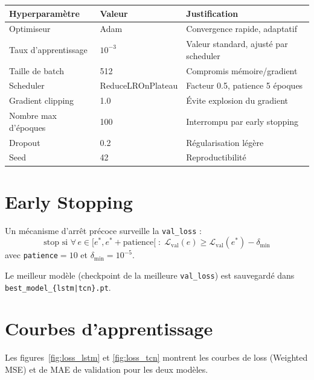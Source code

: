 \documentclass[12pt,a4paper]{report}
\begin{document}
\begin{center}
\begin{tabular}{lll}
\toprule
\rowcolor{fireOrange!15}
\textbf{Hyperparamètre} & \textbf{Valeur} & \textbf{Justification} \\
\midrule
Optimiseur             & Adam             & Convergence rapide, adaptatif \\
Taux d'apprentissage   & $10^{-3}$        & Valeur standard, ajusté par scheduler \\
Taille de batch        & 512              & Compromis mémoire/gradient \\
Scheduler              & ReduceLROnPlateau & Facteur 0.5, patience 5 époques \\
Gradient clipping      & 1.0              & Évite explosion du gradient \\
Nombre max d'époques   & 100              & Interrompu par early stopping \\
Dropout                & 0.2              & Régularisation légère \\
Seed                   & 42               & Reproductibilité \\
\bottomrule
\end{tabular}
\end{center}

\section{Early Stopping}

Un mécanisme d'arrêt précoce surveille la \texttt{val\_loss} :
\begin{equation}
  \text{stop si } \forall\, e \in [e^*, e^* + \text{patience}[ \;:\;
  \mathcal{L}_\text{val}(e) \geq \mathcal{L}_\text{val}(e^*) - \delta_\text{min}
\end{equation}
avec \texttt{patience}$ = 10$ et $\delta_\text{min} = 10^{-5}$.

Le meilleur modèle (checkpoint de la meilleure \texttt{val\_loss}) est sauvegardé dans
\texttt{best\_model\_\{lstm|tcn\}.pt}.

\section{Courbes d'apprentissage}

Les figures~\ref{fig:loss_lstm} et \ref{fig:loss_tcn} montrent les courbes de loss
(Weighted MSE) et de MAE de validation pour les deux modèles.
\end{document}
